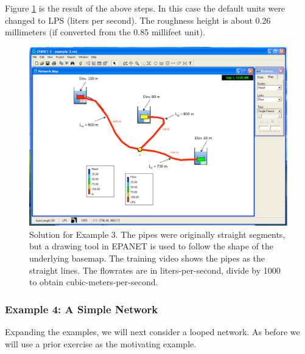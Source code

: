 Figure \ref{fig:3reservoir-epanet} is the result of the above steps.   In this case the default units were changed to LPS (liters per second).  The roughness height is about 0.26 millimeters (if converted from the 0.85 millifeet unit).

\begin{figure}[htbp] %
   \centering
   \includegraphics[width=6in]{3reservoir-epanet.pdf} 
   \caption{Solution for Example 3.  The pipes were originally straight segments, but a drawing tool in EPANET is used to follow the shape of the underlying basemap.   The training video shows the pipes as the straight lines.  The flowrates are in liters-per-second, divide by 1000 to obtain cubic-meters-per-second.}
   \label{fig:3reservoir-epanet}
\end{figure}
\clearpage
\subsubsection{Example 4: A Simple Network}
Expanding the examples, we will next consider a looped network.   As before we will use a prior exercise as the motivating example.

